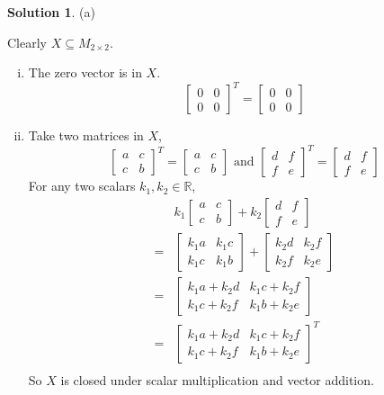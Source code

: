 \documentclass{article}
\theoremstyle{definition}
\newtheorem*{solution}{Solution}
\begin{document}
\begin{solution}

(a)

Clearly $X\subseteq M_{2\times 2}$.
\begin{enumerate}[i)]
 \item The zero vector is in $X$.
 \[\begin{bmatrix}
 0 & 0 \\ 0 & 0
 \end{bmatrix}^T
 =\begin{bmatrix}
 0 & 0 \\ 0 & 0
 \end{bmatrix}
 \]
 \item Take two matrices in $X$,
 \[\begin{bmatrix}
 a & c \\ c & b
 \end{bmatrix}^T
 =\begin{bmatrix}
 a & c \\ c & b
 \end{bmatrix}
 \text{ and }
 \begin{bmatrix}
 d & f \\ f & e
 \end{bmatrix}^T
 =\begin{bmatrix}
 d & f \\ f & e
 \end{bmatrix}
 \]
 For any two scalars $k_1,k_2\in \mathbb{R}$,
 \begin{align*}
 & k_1
 \begin{bmatrix}
 a & c \\ c & b
 \end{bmatrix}+k_2
 \begin{bmatrix}
 d & f \\ f & e
 \end{bmatrix} \\
 = & \begin{bmatrix}
 k_1a & k_1c \\ k_1c & k_1b
 \end{bmatrix}+
 \begin{bmatrix}
 k_2d & k_2f \\ k_2f & k_2e
 \end{bmatrix} \\
 = & \begin{bmatrix}
 k_1a + k_2d & k_1c + k_2f \\ k_1c + k_2f & k_1b + k_2e
 \end{bmatrix} \\
 = & \begin{bmatrix}
 k_1a + k_2d & k_1c + k_2f \\ k_1c + k_2f & k_1b + k_2e
 \end{bmatrix}^T \\
 \end{align*}
 So $X$ is closed under scalar multiplication and vector addition.
\end{enumerate}


\end{solution}
\end{document}

